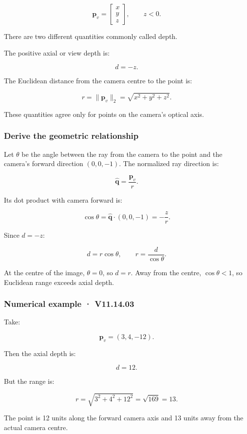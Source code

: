 \[ \mathbf p_v= \begin{bmatrix} x\\y\\z \end{bmatrix}, \qquad z<0. \]

There are two different quantities commonly called depth.

The positive axial or view depth is:

\[ \boxed{d=-z}. \]

The Euclidean distance from the camera centre to the point is:

\[ \boxed{ r=\|\mathbf p_v\|_2=\sqrt{x^2+y^2+z^2}. } \]

These quantities agree only for points on the camera's optical axis.

\subsubsection{Derive the geometric relationship}\label{derive-the-geometric-relationship}

Let \(\theta\) be the angle between the ray from the camera to the point and the camera's forward direction \((0,0,-1)\). The normalized ray direction is:

\[ \hat{\mathbf q}=\frac{\mathbf p_v}{r}. \]

Its dot product with camera forward is:

\[ \cos\theta = \hat{\mathbf q}\cdot(0,0,-1) = -\frac zr. \]

Since \(d=-z\):

\[ \boxed{d=r\cos\theta}, \qquad \boxed{r=\frac d{\cos\theta}}. \]

At the centre of the image, \(\theta=0\), so \(d=r\). Away from the centre, \(\cos\theta<1\), so Euclidean range exceeds axial depth.

\subsubsection{Numerical example · V11.14.03}\label{numerical-example-v11.14.03}

Take:

\[ \mathbf p_v=(3,4,-12). \]

Then the axial depth is:

\[ \boxed{d=12}. \]

But the range is:

\[ r=\sqrt{3^2+4^2+12^2} =\sqrt{169} =\boxed{13}. \]

The point is 12 units along the forward camera axis and 13 units away from the actual camera centre.

